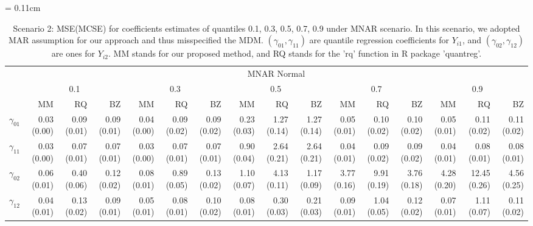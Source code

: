 \documentclass[12pt]{article}
\begin{document}
\begin{landscape}
  \begin{table}[h]
    \renewcommand{\arraystretch}{1.3}
    \scriptsize
    \centering
    \caption{Scenario 2: MSE(MCSE) for coefficients estimates of quantiles
      0.1, 0.3, 0.5, 0.7, 0.9 under MNAR scenario. In this scenario, we adopted MAR assumption
      for our approach and thus misspecified the MDM. $(\gamma_{01}, \gamma_{11})$
      are quantile regression coefficients for $Y_{i1}$, and $(\gamma_{02}, \gamma_{12})$
      are ones for $Y_{i2}$. MM stands for our proposed method, and RQ stands for the 'rq'
      function in R package 'quantreg'.} \label{tab:sim2}
    \vspace{10pt}
    \tabcolsep = 0.11cm
    \begin{tabular}{rrrrrrrrrrrrrrrr}
      \toprule
      & \multicolumn{15}{c}{MNAR Normal} \\
      \cline{2-16}
      &  \multicolumn{3}{c}{0.1} &  \multicolumn{3}{c}{0.3} &  \multicolumn{3}{c}{0.5} &
      \multicolumn{3}{c}{0.7} &  \multicolumn{3}{c}{0.9} \\
      \cline{2-16}
      & MM   & RQ   & BZ   & MM   & RQ   & BZ   & MM   & RQ   & BZ   & MM   & RQ   & BZ   & MM   & RQ   & BZ   \\
      \hline
      $\gamma_{01}$ & 0.03 (0.00) & 0.09 (0.01) & 0.09 (0.01) & 0.04 (0.00) & 0.09 (0.02) & 0.09 (0.02) & 0.23 (0.03) & 1.27 (0.14) & 1.27 (0.14) & 0.05 (0.01) & 0.10 (0.02) & 0.10 (0.02) & 0.05 (0.01) & 0.11 (0.02) & 0.11 (0.02) \\
      $\gamma_{11}$ & 0.03 (0.00) & 0.07 (0.01) & 0.07 (0.01) & 0.03 (0.00) & 0.07 (0.01) & 0.07 (0.01) & 0.90 (0.04) & 2.64 (0.21) & 2.64 (0.21) & 0.04 (0.01) & 0.09 (0.02) & 0.09 (0.02) & 0.04 (0.01) & 0.08 (0.01) & 0.08 (0.01) \\
      $\gamma_{02}$ & 0.06 (0.01) & 0.40 (0.06) & 0.12 (0.02) & 0.08 (0.01) & 0.89 (0.05) & 0.13 (0.02) & 1.10 (0.07) & 4.13 (0.11) & 1.17 (0.09) & 3.77 (0.16) & 9.91 (0.19) & 3.76 (0.18) & 4.28 (0.20) & 12.45 (0.26) & 4.56 (0.25) \\
      $\gamma_{12}$ & 0.04 (0.01) & 0.13 (0.02) & 0.09 (0.01) & 0.05 (0.01) & 0.08 (0.01) & 0.10 (0.02) & 0.08 (0.01) & 0.30 (0.03) & 0.21 (0.03) & 0.09 (0.01) & 1.04 (0.05) & 0.12 (0.02) & 0.07 (0.01) & 1.11 (0.07) & 0.11 (0.02) \\
      \bottomrule
    \end{tabular}


\end{table}
\end{landscape}
\end{document}

